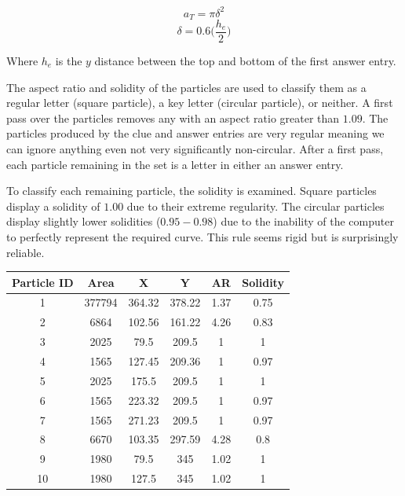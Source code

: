 \documentclass{article}
\begin{document}
	$$ a_T = \pi\delta^2 $$
	$$
		\delta = 0.6\bigg(\frac{h_e}{2}\bigg)
	$$
	
	Where $h_e$ is the $y$ distance between the top and bottom of the first answer entry. \par 
	The aspect ratio and solidity of the particles are used to classify them as a regular letter (square particle), a key letter (circular particle), or neither.  A first pass over the particles removes any with an aspect ratio greater than $1.09$.  The particles produced by the clue and answer entries are very regular meaning we can ignore anything even not very significantly non-circular.  After a first pass, each particle remaining in the set is a letter in either an answer entry.  \par 
	To classify each remaining particle, the solidity is examined.  Square particles display a solidity of $1.00$ due to their extreme regularity.  The circular particles display slightly lower solidities ($0.95-0.98$) due to the inability of the computer to perfectly represent the required curve. This rule seems rigid but is surprisingly reliable. \par 
	
	\begin{center}
		\begin{tabular}{ |c||c|c|c|c|c| } 
			\hline
			Particle ID & Area & X & Y & AR & Solidity \\
			\hline
			\rowcolor[gray]{0.6}
			1&	377794&	364.32&	378.22	&	1.37	&	0.75\\
			\rowcolor[gray]{0.6}
			2&	6864&	102.56&	161.22	&	4.26	&	0.83\\
			3&	2025&	79.5&	209.5	&	1	&	1\\
			4&	1565&	127.45&	209.36	&	1	&	0.97\\
			5&	2025&	175.5	&209.5		&1	&	1\\
			6&	1565&	223.32&	209.5	&	1&		0.97\\
			7	&1565&	271.23	&209.5	&	1	&	0.97\\
			\rowcolor[gray]{0.6}
			8&	6670&	103.35	&297.59	&	4.28	&	0.8\\
			9&	1980&	79.5	&345	&	1.02	&	1\\
			10&	1980&	127.5	&345	&	1.02	&	1\\
			\hline
		\end{tabular}
	\end{center}
\end{document}
